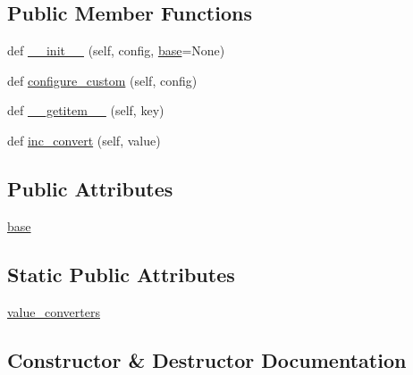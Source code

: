 \subsection*{Public Member Functions}
\begin{DoxyCompactItemize}
\item 
def \hyperlink{classpip_1_1__vendor_1_1distlib_1_1util_1_1Configurator_a8756ed2356b749b999b2262f634c50f2}{\+\_\+\+\_\+init\+\_\+\+\_\+} (self, config, \hyperlink{classpip_1_1__vendor_1_1distlib_1_1util_1_1Configurator_a6b6f68c982d6a97d6d086d7459c48d7d}{base}=None)
\item 
def \hyperlink{classpip_1_1__vendor_1_1distlib_1_1util_1_1Configurator_a0d009327a85c6a6843254c1f00907b99}{configure\+\_\+custom} (self, config)
\item 
def \hyperlink{classpip_1_1__vendor_1_1distlib_1_1util_1_1Configurator_a3ff695c0521e0edb863bb8e6737adc75}{\+\_\+\+\_\+getitem\+\_\+\+\_\+} (self, key)
\item 
def \hyperlink{classpip_1_1__vendor_1_1distlib_1_1util_1_1Configurator_a77abdca1b0e13cf3597eb67fa42bc238}{inc\+\_\+convert} (self, value)
\end{DoxyCompactItemize}
\subsection*{Public Attributes}
\begin{DoxyCompactItemize}
\item 
\hyperlink{classpip_1_1__vendor_1_1distlib_1_1util_1_1Configurator_a6b6f68c982d6a97d6d086d7459c48d7d}{base}
\end{DoxyCompactItemize}
\subsection*{Static Public Attributes}
\begin{DoxyCompactItemize}
\item 
\hyperlink{classpip_1_1__vendor_1_1distlib_1_1util_1_1Configurator_a635216cef15c01071b1dd01750aec194}{value\+\_\+converters}
\end{DoxyCompactItemize}


\subsection{Constructor \& Destructor Documentation}
\mbox{\label{classpip_1_1__vendor_1_1distlib_1_1util_1_1Configurator_a8756ed2356b749b999b2262f634c50f2}} 
